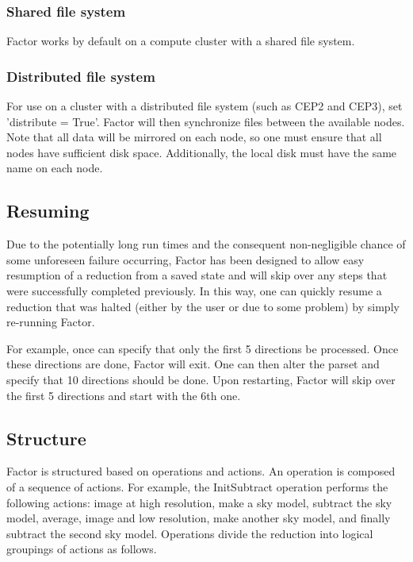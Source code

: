 \documentclass[structabstract]{article}
\begin{document}
{\subsubsection{Shared file system}
Factor works by default on a compute cluster with a shared file system.

\subsubsection{Distributed file system}
For use on a cluster with a distributed file system (such as CEP2 and CEP3), set
'distribute = True'. Factor will then synchronize files between the available
nodes. Note that all data will be mirrored on each node, so one must ensure that all nodes
have sufficient disk space. Additionally, the local disk must have the same
name on each node.


\subsection{Resuming}
\label{factor:resuming}

Due to the potentially long run times and the consequent non-negligible chance
of some unforeseen failure occurring, Factor has been designed to allow easy
resumption of a reduction from a saved state and will skip over any steps that
were successfully completed previously. In this way, one can quickly resume a
reduction that was halted (either by the user or due to some problem) by simply
re-running Factor.

For example, once can specify that only the first 5 directions be processed.
Once these directions are done, Factor will exit. One can then alter the parset
and specify that 10 directions should be done. Upon restarting, Factor will skip
over the first 5 directions and start with the 6th one.


\subsection{Structure}
\label{factor:structure}

Factor is structured based on operations and actions. An operation is composed of a sequence of actions. For example, the InitSubtract operation performs the following actions: image at high resolution, make a sky model, subtract the sky model, average, image and low resolution, make another sky model, and finally subtract the second sky model.
Operations divide the reduction into logical groupings of actions as follows.

}
\end{document}

